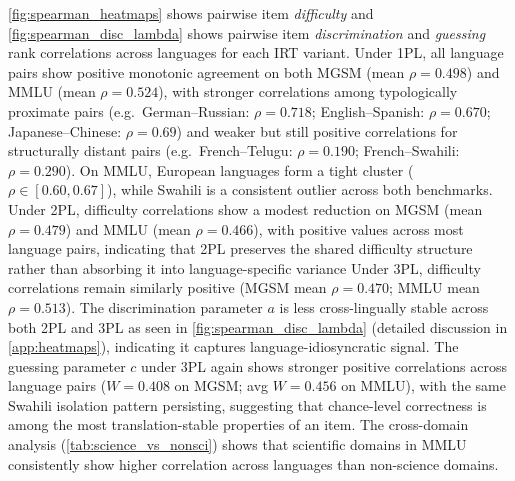 \documentclass[11pt]{article}
\begin{document}
\autoref{fig:spearman_heatmaps} shows pairwise item \textit{difficulty} and \autoref{fig:spearman_disc_lambda} shows pairwise item \textit{discrimination} and \textit{guessing }rank correlations across languages for each IRT variant. Under 1PL, all language pairs show positive monotonic agreement on both MGSM (mean $\rho = 0.498$) and MMLU (mean $\rho = 0.524$), with stronger correlations among typologically proximate pairs (e.g.\ German--Russian: $\rho = 0.718$; English--Spanish: $\rho = 0.670$; Japanese--Chinese: $\rho = 0.69$) and weaker but still positive correlations for structurally distant pairs (e.g.\ French--Telugu: $\rho = 0.190$; French--Swahili: $\rho = 0.290$). On MMLU, European languages form a tight cluster ($\rho \in [0.60, 0.67]$), while Swahili is a consistent outlier across both benchmarks. Under 2PL, difficulty correlations show a modest reduction on MGSM (mean $\rho = 0.479$) and MMLU (mean $\rho = 0.466$), with positive values across most language pairs, indicating that 2PL preserves the shared difficulty structure rather than absorbing it into language-specific variance %
Under 3PL, difficulty correlations remain similarly positive (MGSM mean $\rho = 0.470$; MMLU mean $\rho = 0.513$). The discrimination parameter $a$ is less cross-lingually stable across both 2PL and 3PL as seen in \autoref{fig:spearman_disc_lambda} (detailed discussion in \autoref{app:heatmaps}), indicating it captures language-idiosyncratic signal. The guessing parameter $c$ under 3PL again shows stronger positive correlations across language pairs ($W = 0.408$ on MGSM; avg $W = 0.456$ on MMLU), with the same Swahili isolation pattern persisting, suggesting that chance-level correctness is among the most translation-stable properties of an item. The cross-domain analysis (\autoref{tab:science_vs_nonsci}) shows that scientific domains in MMLU consistently show higher correlation across languages than non-science domains.
\end{document}
